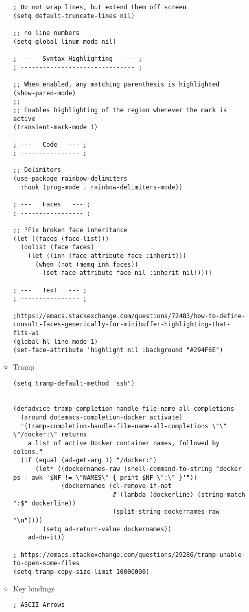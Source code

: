 \documentclass{article}
\begin{document}
\begin{itemize}
\begin{itemize}
\begin{verbatim}
; Do not wrap lines, but extend them off screen
(setq default-truncate-lines nil)

;; no line numbers
(setq global-linum-mode nil)

; ---   Syntax Highlighting   --- ;
; ------------------------------- ;

;; When enabled, any matching parenthesis is highlighted
(show-paren-mode)
;;
;; Enables highlighting of the region whenever the mark is active
(transient-mark-mode 1)

; ---   Code   --- ;
; ---------------- ;

;; Delimiters
(use-package rainbow-delimiters
  :hook (prog-mode . rainbow-delimiters-mode))

; ---   Faces   --- ;
; ----------------- ;

;; ?Fix broken face inheritance
(let ((faces (face-list)))
  (dolist (face faces)
    (let ((inh (face-attribute face :inherit)))
      (when (not (memq inh faces))
        (set-face-attribute face nil :inherit nil)))))

; ---   Text   --- ;
; ---------------- ;

;https://emacs.stackexchange.com/questions/72483/how-to-define-consult-faces-generically-for-minibuffer-highlighting-that-fits-wi
(global-hl-line-mode 1)
(set-face-attribute 'highlight nil :background "#294F6E")

\end{verbatim}
\item Tramp
\label{sec:orgfd09061}
\begin{verbatim}
(setq tramp-default-method "ssh")


(defadvice tramp-completion-handle-file-name-all-completions
  (around dotemacs-completion-docker activate)
  "(tramp-completion-handle-file-name-all-completions \"\" \"/docker:\" returns
    a list of active Docker container names, followed by colons."
  (if (equal (ad-get-arg 1) "/docker:")
      (let* ((dockernames-raw (shell-command-to-string "docker ps | awk '$NF != \"NAMES\" { print $NF \":\" }'"))
             (dockernames (cl-remove-if-not
                           #'(lambda (dockerline) (string-match ":$" dockerline))
                           (split-string dockernames-raw "\n"))))
        (setq ad-return-value dockernames))
    ad-do-it))

; https://emacs.stackexchange.com/questions/29286/tramp-unable-to-open-some-files
(setq tramp-copy-size-limit 10000000)
\end{verbatim}
\item Key bindings
\label{sec:org2456014}
\begin{verbatim}
; ASCII Arrows


\end{verbatim}
\end{itemize}
\end{itemize}
\end{document}
